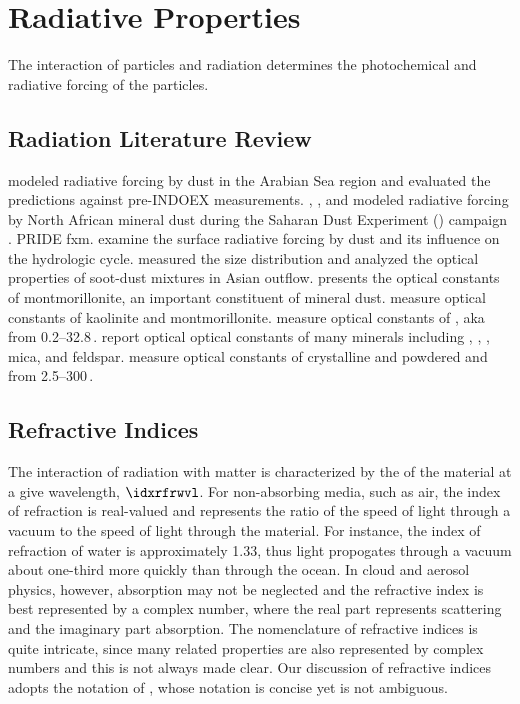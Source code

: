 \documentclass[12pt,twoside]{book}
\begin{document}
\chapter{Radiative Properties}\label{sxn:rdn}
The interaction of particles and radiation determines the
photochemical and radiative forcing of the particles.

\section[Radiation Literature Review]{Radiation Literature Review}\label{sxn:rdn_ltr}
\cite{Geo01} modeled radiative forcing by dust in the Arabian Sea 
region and evaluated the predictions against pre-INDOEX measurements. 
\cite{MGH03}, \cite{HHS03}, and \cite{HFO03} modeled radiative forcing
by North African mineral dust during the Saharan Dust Experiment
() campaign \cite[]{THP03}. 
\cite{CWJ03} PRIDE fxm.
\cite{MTP04} examine the surface radiative forcing by dust and its
influence on the hydrologic cycle.
\cite{CSK04} measured the size distribution and analyzed the optical
properties of soot-dust mixtures in Asian outflow.
\cite{Rou05} presents the optical constants of montmorillonite, an
important constituent of mineral dust.
\cite{RPO91} measure optical constants of kaolinite and
montmorillonite.
\cite{QOL78} measure optical constants of , aka
 from 0.2--32.8\,\um. 
\cite{EgH79} report optical optical constants of many minerals including
, , , mica,
and feldspar. 
\cite{LQB93} measure optical constants of crystalline and powdered
 and  from 2.5--300\,\um.

\section[Refractive Indices]{Refractive Indices}\label{sxn:idx_rfr}
The interaction of radiation with matter is characterized by the
 of the material at a give wavelength,
$\idxrfrwvl$. 
For non-absorbing media, such as air, the index of refraction is
real-valued and represents the ratio of the speed of light through a
vacuum to the speed of light through the material. 
For instance, the index of refraction of water is approximately 1.33, 
thus light propogates through a vacuum about one-third more quickly
than through the ocean.
In cloud and aerosol physics, however, absorption may not be neglected
and the refractive index is best represented by a complex number,
where the real part represents scattering and the imaginary part
absorption. 
The nomenclature of refractive indices is quite intricate, since 
many related properties are also represented by complex numbers and 
this is not always made clear.
Our discussion of refractive indices adopts the notation of
\cite{BoH83}, whose notation is concise yet is not ambiguous.
\end{document}
